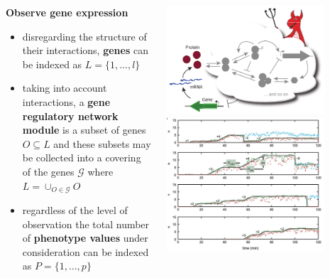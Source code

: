 \begin{frame}
\begin{columns}[c]
\begin{column}{0.5\textwidth}
\begin{block}{\textbf{Observe gene expression}}
\begin{small}
\begin{itemize}
\item disregarding the structure of their interactions, \textbf{genes} can be indexed as $L = \{1, \ldots, l \}$
\item taking into account interactions, a \textbf{gene regulatory network module} is a subset of genes $O \subseteq L$ and these subsets may be collected into a covering of the genes $\mathcal{G}$ where $L = \cup_{O \in \mathcal{G}} O$
\item regardless of the level of observation the total number of \textbf{phenotype values} under consideration can be indexed as $P = \{ 1, \ldots, p \} $
\end{itemize}
\end{small}
\end{block}
\end{column}
\begin{column}{0.5\textwidth}
\begin{center}
\includegraphics[width=0.8\textwidth]{fig/geneexpressiondemon.pdf}
\cite{Lestas2010}
\includegraphics[width=0.8\textwidth]{fig/transcriptcounts.png}

\end{center}
\end{column}
\end{columns}
\end{frame}
